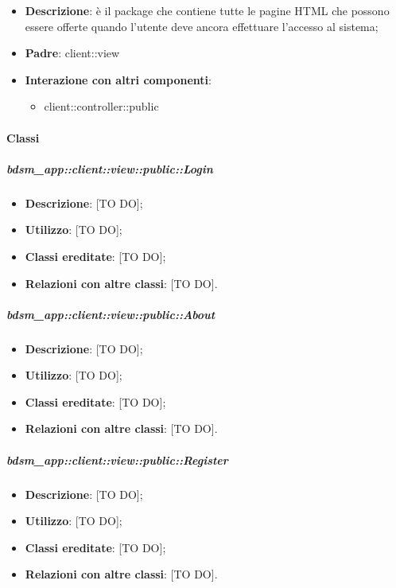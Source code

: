 	\begin{itemize}
		\item \textbf{Descrizione}: è il package che contiene tutte le pagine HTML che possono essere offerte quando l'utente deve ancora effettuare l'accesso al sistema;
		\item \textbf{Padre}: client::view
		\item \textbf{Interazione con altri componenti}: 
			\begin{itemize}
				\item client::controller::public
			\end{itemize}
	\end{itemize}

		\paragraph{Classi} %
			\subparagraph{bdsm\_app::client::view::public::Login} %
			\label{subp:bdsm_app_client_view_public_login}
				\begin{itemize}
					\item \textbf{Descrizione}: [TO DO];
					\item \textbf{Utilizzo}: [TO DO];
					\item \textbf{Classi ereditate}: [TO DO];
					\item \textbf{Relazioni con altre classi}: [TO DO].
				\end{itemize}

			\subparagraph{bdsm\_app::client::view::public::About} %
			\label{subp:bdsm_app_client_view_public_about}
				\begin{itemize}
					\item \textbf{Descrizione}: [TO DO];
					\item \textbf{Utilizzo}: [TO DO];
					\item \textbf{Classi ereditate}: [TO DO];
					\item \textbf{Relazioni con altre classi}: [TO DO].
				\end{itemize}

			\subparagraph{bdsm\_app::client::view::public::Register} %
			\label{subp:bdsm_app_client_view_public_register}
				\begin{itemize}
					\item \textbf{Descrizione}: [TO DO];
					\item \textbf{Utilizzo}: [TO DO];
					\item \textbf{Classi ereditate}: [TO DO];
					\item \textbf{Relazioni con altre classi}: [TO DO].
				\end{itemize}


